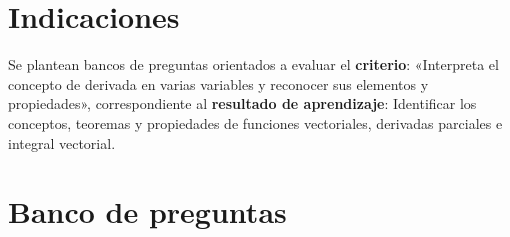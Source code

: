 \documentclass[a4,11pt]{aleph-notas}
\begin{document}
\encabezado

\vspace*{-8mm}
\tableofcontents

\section{Indicaciones}

Se plantean bancos de preguntas orientados a evaluar el \textbf{criterio}: «Interpreta el concepto de derivada en varias variables y reconocer sus elementos y propiedades», correspondiente al \textbf{resultado de aprendizaje}: Identificar los conceptos, teoremas y propiedades de funciones vectoriales, derivadas parciales e integral vectorial.

\section{Banco de preguntas}
\end{document}
